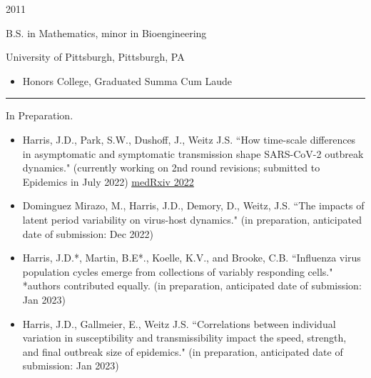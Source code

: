 \documentclass[a4paper,10pt]{article}
\newlength{\cvcolumngapwidth}
\newlength{\cvleftcolumnwidth}
\newlength{\cvrightcolumnwidth}
\newcommand{\cvsectionstyle}[1]{{\normalsize\cvsectionfont\textcolor{cvsectioncolor}{#1}}}
\newcommand{\cvtitlestyle}[1]{{\large\cvtitlefont\textcolor{cvtitlecolor}{#1}}}
\newcommand{\cvdurationstyle}[1]{{\small\cvdurationfont\textcolor{cvdurationcolor}{#1}}}
\newlength{\cvafteritemskipamount}
\newlength{\cvaftersectionskipamount}
\newlength{\cvbetweensectionandheadingextraskipamount}
\newlength{\cvaftertitleskipamount}
\newlength{\cvparskip}
\newcommand{\cvsection}[1]{
            \begin{minipage}[t]{\cvleftcolumnwidth}
                \raggedleft\cvsectionstyle{#1}
            \end{minipage}%
            \hspace{\cvcolumngapwidth}%
            \begin{minipage}[t]{\cvrightcolumnwidth}
                \textcolor{cvrulecolor}{\rule{\cvrightcolumnwidth}{0.3mm}}
            \end{minipage}
        
            \vspace{\cvaftersectionskipamount}
        }
\newcommand{\cvitem}[2]{
            \begin{minipage}[t]{\cvleftcolumnwidth}
                \raggedleft #1
            \end{minipage}%
            \hspace{\cvcolumngapwidth}%
            \begin{minipage}[t]{\cvrightcolumnwidth}
                \setlength{\parskip}{\cvparskip} #2
            \end{minipage}
        
            \vspace{\cvafteritemskipamount}
        }
\newcommand{\cvtitle}[1]{
            \cvtitlestyle{#1}
        
            \vspace{\cvaftertitleskipamount}
            \vspace{-\cvparskip}
        }
\begin{document}
        \cvitem{
            \cvdurationstyle{2011}
        }{
            \cvtitle{B.S. in Mathematics, minor in Bioengineering}
        	University of Pittsburgh, Pittsburgh, PA
            \begin{itemize}[leftmargin=*]
                \item  Honors College, Graduated Summa Cum Laude
            \end{itemize}
        }
        
        \cvsection{PUBLICATIONS}
        
        \cvitem{
            \cvdurationstyle{In Preparation.}
        }{
            \begin{itemize}[leftmargin=*]
            	\item Harris, J.D., Park, S.W., Dushoff, J., Weitz J.S. ``How time-scale differences in asymptomatic and symptomatic transmission shape SARS-CoV-2 outbreak dynamics." (currently working on 2nd round revisions; submitted to Epidemics in July 2022)
	\href{https://www.medrxiv.org/content/10.1101/2022.04.21.22274139.abstract}{\underline{medRxiv 2022}}
	\newpage
	
	        	\item Dominguez Mirazo, M., Harris, J.D., Demory, D., Weitz, J.S. ``The impacts of latent period variability on virus-host dynamics." (in preparation, anticipated date of submission: Dec 2022)	
		\item Harris, J.D.*, Martin, B.E*., Koelle, K.V., and Brooke, C.B. ``Influenza virus population cycles emerge from collections of variably responding cells." *authors contributed equally. (in preparation, anticipated date of submission: Jan 2023)
		
		\item Harris, J.D., Gallmeier, E., Weitz J.S. ``Correlations between individual variation in susceptibility and transmissibility impact the speed, strength, and final outbreak size of epidemics." (in preparation, anticipated date of submission: Jan 2023)
			
	 \end{itemize}
	}    	
	
\end{document}
